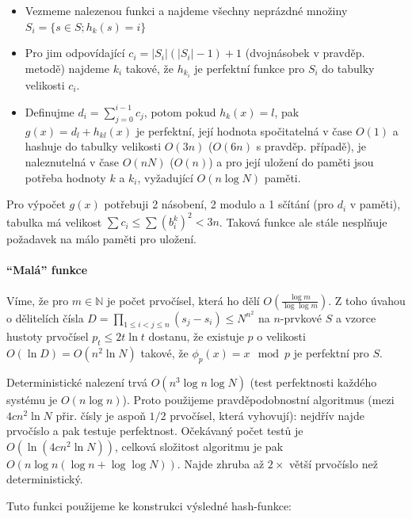 \documentclass[11pt]{report} %
\numberwithin{equation}{section}
\begin{document}
\begin{itemize}
	
	\item
	Vezmeme nalezenou funkci a najdeme všechny neprázdné množiny
	$S_i=\{s\in S;h_k(s)=i\}$
	\item
	Pro jim odpovídající $c_i=|S_i|(|S_i|-1)+1$ (dvojnásobek v
	pravděp. metodě) najdeme $k_i$ takové, že $h_{k_i}$ je
	perfektní funkce pro $S_i$ do tabulky velikosti $c_i$.
	\item
	Definujme $d_i=\sum_{j=0}^{i-1}c_j$, potom pokud
	$h_k(x)=l$, pak $g(x)=d_l+h_{kl}(x)$ je perfektní, její
	hodnota spočitatelná v čase $O(1)$ a hashuje do tabulky
	velikosti $O(3n)$ ($O(6n)$ s pravděp. případě), je
	naleznutelná v čase $O(nN)$ ($O(n)$) a pro její uložení do
	paměti jsou potřeba hodnoty $k$ a $k_i$, vyžadující
	$O(n\log N)$ paměti.
\end{itemize}

Pro výpočet $g(x)$ potřebuji 2 násobení, 2 modulo a 1 sčítání (pro
$d_i$ v paměti), tabulka má velikost
$\sum c_i\leq\sum (b_i^k)^2<3n$. Taková funkce ale stále nesplňuje
požadavek na málo paměti pro uložení.

\paragraph{\texorpdfstring{``Malá''
		funkce}{Malá funkce}}\label{maluxe1-funkce}

Víme, že pro $m\in\mathbb{N}$ je počet prvočísel, která ho dělí
$O(\frac{\log m}{\log\log m})$. Z toho úvahou o dělitelích čísla
$D=\prod_{1\leq i<j\leq n}(s_j-s_i)\leq N^{n^2}$ na
$n$-prvkové $S$ a vzorce hustoty prvočísel
$p_t\leq 2t\ln t$ dostanu, že existuje $p$ o velikosti
$O(\ln D)=O(n^2\ln N)$ takové, že $\phi_p(x)=x\mod p$ je
perfektní pro $S$.

Deterministické nalezení trvá $O(n^3\log n\log N)$ (test
perfektnosti každého systému je $O(n\log n)$). Proto použijeme
pravděpodobnostní algoritmus (mezi $4cn^2\ln N$ přir. čísly je
aspoň $1/2$ prvočísel, která vyhovují): nejdřív najde prvočíslo a
pak testuje perfektnost. Očekávaný počet testů je
$O(\ln(4cn^2\ln N))$, celková složitost algoritmu je pak
$O(n\log n(\log n+\log\log N))$. Najde zhruba až $2\times$
větší prvočíslo než deterministický.

Tuto funkci použijeme ke konstrukci výsledné hash-funkce:
\end{document}
